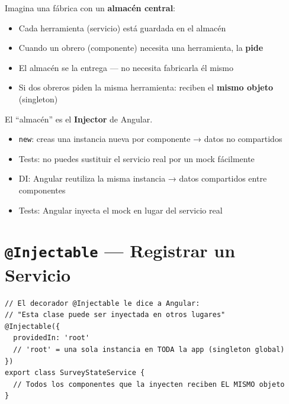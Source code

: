 \documentclass[12pt, a4paper]{article}
\begin{document}
\begin{tcolorbox}[analogia, title={\emoji{convenience-store} \emoji{package} El Almacén Central}]
  Imagina una fábrica con un \textbf{almacén central}:
  \begin{itemize}
    \item {} Cada herramienta (servicio) está guardada en el almacén
    \item {} Cuando un obrero (componente) necesita una herramienta, la \textbf{pide}
    \item {} El almacén se la entrega --- no necesita fabricarla él mismo
    \item {} Si dos obreros piden la misma herramienta: reciben el \textbf{mismo objeto} (singleton)
  \end{itemize}
  El ``almacén'' es el \textbf{Injector} de Angular.
\end{tcolorbox}

\begin{tcolorbox}[importante, title={\emoji{question} \emoji{light-bulb} ¿Por qué no hacer \texttt{new MiServicio()}?}]
  \begin{itemize}
    \item {} \texttt{new}: creas una instancia nueva por componente → datos no compartidos
    \item {} Tests: no puedes sustituir el servicio real por un mock fácilmente
    \item {} DI: Angular reutiliza la misma instancia → datos compartidos entre componentes
    \item {} Tests: Angular inyecta el mock en lugar del servicio real
  \end{itemize}
\end{tcolorbox}

\section{  \texttt{@Injectable} --- Registrar un Servicio}

\begin{lstlisting}
// El decorador @Injectable le dice a Angular:
// "Esta clase puede ser inyectada en otros lugares"
@Injectable({
  providedIn: 'root'
  // 'root' = una sola instancia en TODA la app (singleton global)
})
export class SurveyStateService {
  // Todos los componentes que la inyecten reciben EL MISMO objeto
}
\end{lstlisting}
\end{document}
